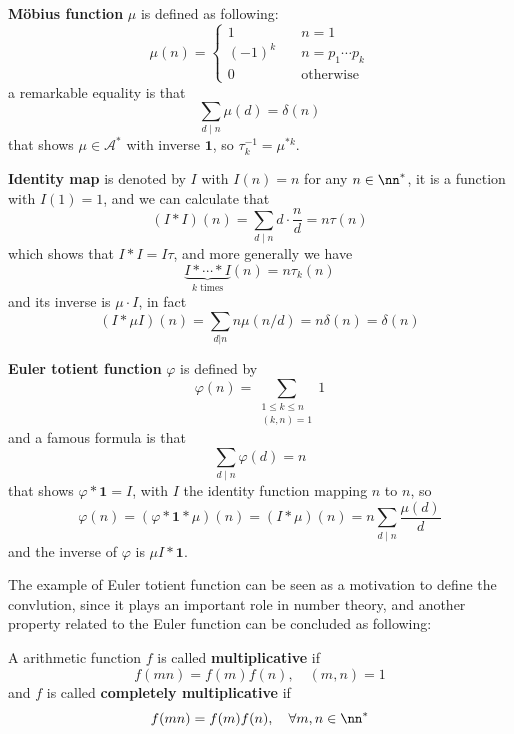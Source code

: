 \begin{colorexample}
    \textbf{Möbius function} \(\mu\) is defined as following:
    \[\mu(n) = \begin{cases}
        1 \quad & n =1 \\
        (-1)^k \quad & n=p_1\cdots p_k \\
        0 \quad & \text{otherwise}
    \end{cases}\]
    a remarkable equality is that 
    \[\sum_{d \mid n} \mu(d) = \delta(n)\]
    that shows \(\mu \in \mathcal{A}^*\) with inverse \(\mathbf{1}\), so \(\tau_k^{-1} = \mu^{*k}\).
    
\end{colorexample}

\begin{example}
    \textbf{Identity map} is denoted by \(I\) with \(I(n) = n\) for any \(n \in \nn^*\), it is a function with \(I(1) = 1\), and we can calculate that
    \[(I*I)(n) = \sum_{d \mid n} d \cdot \frac{n}{d} = n \tau(n)\]
    which shows that \(I *I = I\tau \), and more generally we have 
    \[\underbrace{I * \cdots * I}_{k \text{ times}} (n) = n \tau_k(n) \]
    and its inverse is \(\mu \cdot I\), in fact
    \[(I * \mu I)(n) = \sum_{d|n}n \mu(n/d)  = n \delta (n) = \delta(n)\]
\end{example}

\begin{colorexample} \label{eulerfunction}
    \textbf{Euler totient function} \(\varphi\) is defined by
    \[\varphi(n) = \sum_{\substack{1 \leq k \leq n \\ (k,n) = 1}} 1\]
    and a famous formula is that
    \[\sum_{d \mid n} \varphi(d) = n\]
    that shows \(\varphi * \mathbf{1} = I\), with \(I\) the identity function mapping \(n\) to \(n\), so 
    \[\varphi(n) =  (\varphi* \mathbf{1} * \mu)(n) = (I * \mu)(n) = n\sum_{d \mid n}\frac{\mu(d)}{d}\]
    and the inverse of \(\varphi\) is \(\mu I * \mathbf{1}\).
\end{colorexample}

The example of Euler totient function can be seen as a motivation to define the convlution, since it plays an important role in number theory, and another property related to the Euler function can be concluded as following:

\begin{definition}
    A arithmetic function \(f\) is called \textbf{multiplicative} if 
    \[f(mn) = f(m)f(n), \quad (m,n) = 1\]
    and \(f\) is called \textbf{completely multiplicative} if 
    \[f(mn) = f(m)f(n), \quad \forall m,n \in \nn^*\]
    
\end{definition}

